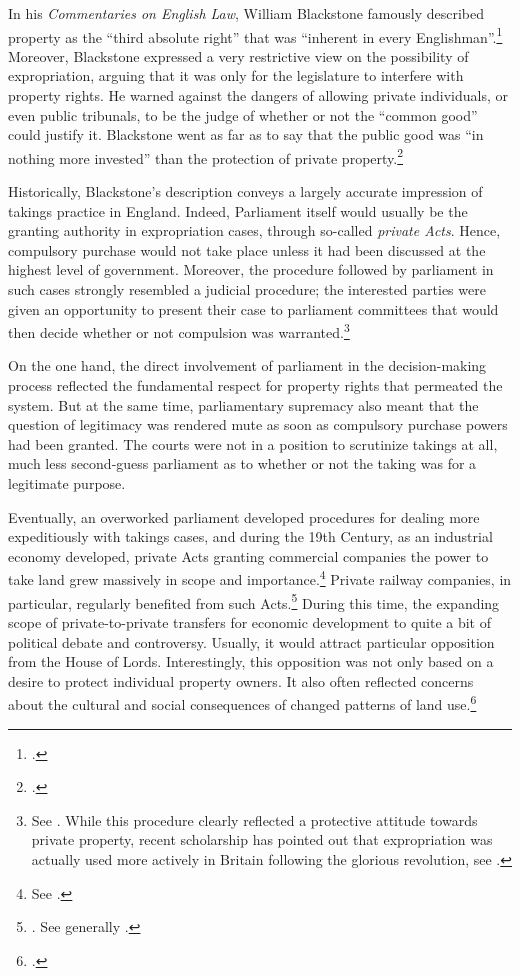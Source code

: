 In his {\it Commentaries on English Law}, William Blackstone famously described property as the ``third absolute right'' that was ``inherent in every Englishman''.\footcite[134-135]{blackstone79}  Moreover, Blackstone expressed a very restrictive view on the possibility of expropriation, arguing that it was only for the legislature to interfere with property rights. He warned against the dangers of allowing private individuals, or even public tribunals, to be the judge of whether or not the ``common good'' could justify it. Blackstone went as far as to say that the public good was ``in nothing more invested'' than the protection of private property.\footcite[134-135]{blackstone79}

Historically, Blackstone's description conveys a largely accurate impression of takings practice in England. Indeed, Parliament itself would usually be the granting authority in expropriation cases, through so-called {\it private Acts}. Hence, compulsory purchase would not take place unless it had been discussed at the highest level of government. Moreover, the procedure followed by parliament in such cases strongly resembled a judicial procedure; the interested parties were given an opportunity to present their case to parliament committees that would then decide whether or not compulsion was warranted.\footnote{See \cite[13-16]{allen00}. While this procedure clearly reflected a protective attitude towards private property, recent scholarship has pointed out that expropriation was actually used more actively in Britain following the glorious revolution, see \cite{hoppit11}.} 

On the one hand, the direct involvement of parliament in the decision-making process reflected the fundamental respect for property rights that permeated the system. But at the same time, parliamentary supremacy also meant that the question of legitimacy was rendered mute as soon as compulsory purchase powers had been granted. The courts were not in a position to scrutinize takings at all, much less second-guess parliament as to whether or not the taking was for a legitimate purpose.

Eventually, an overworked parliament developed procedures for dealing more expeditiously with takings cases, and during the 19th Century, as an industrial economy developed, private Acts granting commercial companies the power to take land grew massively in scope and importance.\footnote{See \cite[204]{allen00}.} Private railway companies, in particular, regularly benefited from such Acts.\footnote{\cite[204]{allen00}. See generally \cite{kostal97}.} During this time, the expanding scope of private-to-private transfers for economic development  to quite a bit of political debate and controversy. Usually, it would attract particular opposition from the House of Lords. Interestingly, this opposition was not only based on a desire to protect individual property owners. It also often reflected concerns about the cultural and social consequences of changed patterns of land use.\footcite[204]{allen00} 

